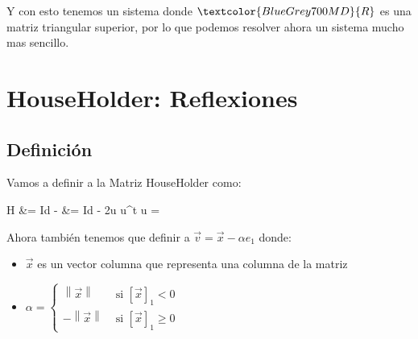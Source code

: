 \documentclass[12pt, fleqn]{report}                             %
\def \Eq {equation}                                             %
\newenvironment{MultiLineEquation*}[1]                          %
        {\begin{\Eq*}\begin{alignedat}{#1}}                         %
        {\end{alignedat}\end{\Eq*}}                                 %
\newenvironment{largeEq} {\begingroup \large}{\endgroup}        %
\DeclareMathOperator \Space     {\quad}                         %
\theoremstyle{break}                                            %
\newcommand{\Abs}[1]    {\left\lVert #1 \right\lVert}           %
\newcommand{\Color}[2]{\textcolor{#1}{#2}}                      %
\newcommand \ColorMatrixR       {BlueGrey700MD}                 %
\newcommand \MatrixR      {\Color{\ColorMatrixR}{R}}            %
\begin{document}
            Y con esto tenemos un sistema donde $\MatrixR$ es una matriz triangular superior, por lo que podemos
            resolver ahora un sistema mucho mas sencillo.



    \chapter{HouseHolder: Reflexiones}

        \clearpage
        \section{Definición}

            Vamos a definir a la Matriz HouseHolder como:
            \begin{largeEq}
                \begin{MultiLineEquation*}{3}
                    H
                        &= Id - \frac{2(v v^t)}{\Abs{v}^2} \;                                   
                        &= Id - 2u u^t \Space {} u = \frac{\vec v}{\Abs{\vec v}}
                \end{MultiLineEquation*}
            \end{largeEq}

            Ahora también tenemos que definir a $\vec v = \vec x - \alpha e_1$ donde:
            \begin{itemize}
                \item $\vec x$ es un vector columna que representa una columna de la matriz
            \item $
                    \alpha = 
                        \begin{cases}
                            \Abs{\vec x} & \text{ si } [\vec x]_1 < 0       \\
                            - \Abs{\vec x} & \text{ si } [\vec x]_1 \geq 0    
                        \end{cases}
                $
            \end{itemize}
\end{document}
